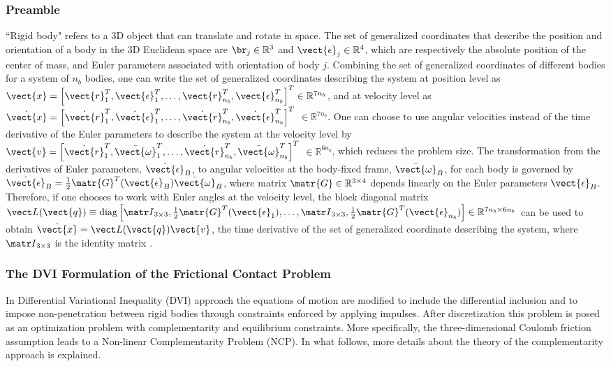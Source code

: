 \subsubsection*{Preamble}
``Rigid body" refers to a 3D object that can translate and rotate in space. The set of generalized coordinates that describe the position and orientation of a body in the 3D Euclidean space are $\br_j\in \mathbb{R}^3$ and $\vect{\epsilon}_j\in \mathbb{R}^4$, which are respectively the absolute position of the center of mass, and Euler parameters associated with orientation of body $j$. Combining the set of generalized coordinates of different bodies for a system of $n_b$ bodies, one can write the set of generalized coordinates describing the system at position level as $\vect{x} = \left[ \vect{r}_1^T, \vect{\epsilon}_1^T,\ldots,\vect{r}_{n_b}^T, \vect{\epsilon}_{n_b}^T \right]^T \in \mathbb{R}^{7 n_b} $, and at velocity level as  $\dot{\vect{x}} = \left[ \dot{\vect{r}}_1^T, \dot{\vect{\epsilon}}_1^T,\ldots, \dot{\vect{r}}_{n_b}^T, 
\dot{\vect{\epsilon}}_{n_b}^T \right]^T$ $\in \mathbb{R}^{7 n_b}$. One can choose to use angular velocities instead of the time derivative of the Euler parameters to describe the system at the velocity level by  $\vect{v} = \left[ \dot{\vect{r}}_1^T, \bar{\vect{\omega}}_1^T,\ldots, \dot{\vect{r}}_{n_b}^T, 
\bar{\vect{\omega}}_{n_b}^T \right]^T$ $\in \mathbb{R}^{6 n_b}$, which reduces the problem size. The transformation from the derivatives of Euler parameters, ${\dot{\vect{\epsilon}}}_{B}$, to angular velocities at the body-fixed frame, ${\bar{\vect{\omega}}}_{B}$, for each body is governed by ${\dot{\vect{\epsilon}}}_{B}=\frac{1}{2} {\matr{G}}^T(\vect{\epsilon}_{B}) {\bar{\vect{\omega}}}_{B} $, where matrix ${\matr{G}}\in {\mathbb{R}}^{3 \times 4}$ depends linearly on the Euler parameters ${\vect{\epsilon}}_{B}$. Therefore, if one chooses to work with Euler angles at the velocity level, the block diagonal matrix  ${\vect L}(\vect{q}) \equiv \mbox{diag} \left[{{\matr I}}_{3 \times 3}, \frac{1}{2} {\matr{G}}^T(\vect{\epsilon}_{1}),\ldots,{\matr I}_{3 \times 3}, \frac{1}{2} {\matr{G}}^T(\vect{\epsilon}_{n_b})\right] \in {\mathbb{R}}^{7 n_b \times 6 n_b}$ can be used to obtain ${\dot{\vect{x}}} = {\vect L}({\vect{q}}) \vect{v}$, the time derivative of the set of generalized coordinate describing the system, where ${\matr I}_{3 \times 3}$ is the identity matrix \cite{Haug89}. 

\subsubsection*{The DVI Formulation of the Frictional Contact Problem}
In Differential Variational Inequality (DVI) \cite{pastew03dvi} approach the equations of motion are modified to include the differential inclusion \cite{filippov1967classical} and to impose non-penetration between rigid bodies through constraints enforced by applying impulses. After discretization this problem is posed as an optimization problem with complementarity and equilibrium constraints. More specifically, the three-dimensional Coulomb friction assumption leads to a Non-linear Complementarity Problem (NCP).  In what follows, more details about the theory of the complementarity approach is explained.

